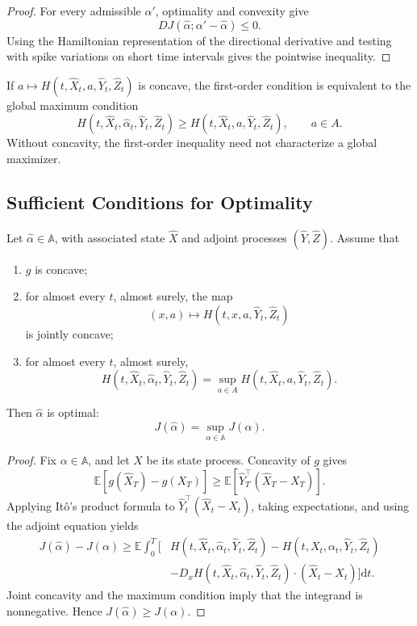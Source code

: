 \begin{proof}
For every admissible \(\alpha'\), optimality and convexity give
\[
D J(\hat\alpha;\alpha'-\hat\alpha)\le0.
\]
Using the Hamiltonian representation of the directional derivative and testing with spike variations on short time intervals gives the pointwise inequality.
\end{proof}

\begin{remark}
If \(a\mapsto H(t,\hat X_t,a,\hat Y_t,\hat Z_t)\) is concave, the first-order condition is equivalent to the global maximum condition
\[
H(t,\hat X_t,\hat\alpha_t,\hat Y_t,\hat Z_t)
\ge
H(t,\hat X_t,a,\hat Y_t,\hat Z_t),
\qquad a\in A.
\]
Without concavity, the first-order inequality need not characterize a global maximizer.
\end{remark}

\subsection{Sufficient Conditions for Optimality}

\begin{thm}
Let \(\hat\alpha\in\mathbb A\), with associated state \(\hat X\) and adjoint processes \((\hat Y,\hat Z)\). Assume that
\begin{enumerate}[label=\textup{(\roman*)}]
\item \(g\) is concave;
\item for almost every \(t\), almost surely, the map
\[
(x,a)\mapsto H(t,x,a,\hat Y_t,\hat Z_t)
\]
is jointly concave;
\item for almost every \(t\), almost surely,
\[
H(t,\hat X_t,\hat\alpha_t,\hat Y_t,\hat Z_t)
=\sup_{a\in A}
H(t,\hat X_t,a,\hat Y_t,\hat Z_t).
\]
\end{enumerate}
Then \(\hat\alpha\) is optimal:
\[
J(\hat\alpha)
=\sup_{\alpha\in\mathbb A}J(\alpha).
\]
\end{thm}

\begin{proof}
Fix \(\alpha\in\mathbb A\), and let \(X\) be its state process. Concavity of \(g\) gives
\[
\mathbb E[g(\hat X_T)-g(X_T)]
\ge
\mathbb E[\hat Y_T^\top(\hat X_T-X_T)].
\]
Applying It\^o's product formula to
\(\hat Y_t^\top(\hat X_t-X_t)\), taking expectations, and using the adjoint equation yields
\[
\begin{aligned}
J(\hat\alpha)-J(\alpha)
\ge\mathbb E\int_0^T\biggl[
&H(t,\hat X_t,\hat\alpha_t,\hat Y_t,\hat Z_t)
-H(t,X_t,\alpha_t,\hat Y_t,\hat Z_t)\\
&-D_xH(t,\hat X_t,\hat\alpha_t,\hat Y_t,\hat Z_t)
\cdot(\hat X_t-X_t)
\biggr]\mathrm dt.
\end{aligned}
\]
Joint concavity and the maximum condition imply that the integrand is nonnegative. Hence \(J(\hat\alpha)\ge J(\alpha)\).
\end{proof}

